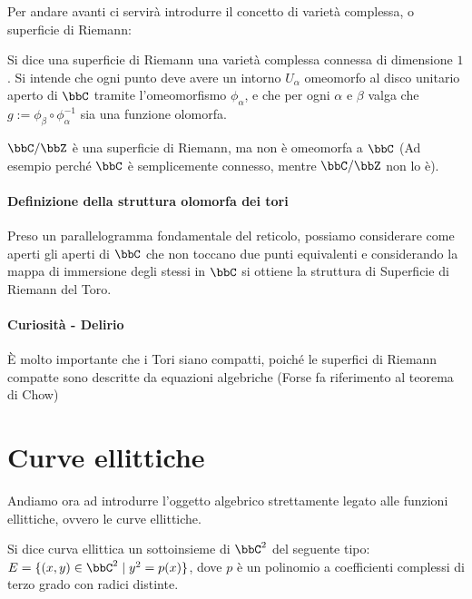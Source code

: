 Per andare avanti ci servirà introdurre il concetto di varietà complessa, o superficie di Riemann:
\begin{definizione}
  Si dice una superficie di Riemann una varietà complessa connessa di dimensione $1$.  Si intende che ogni punto deve avere un intorno $U_\alpha$ omeomorfo al disco unitario aperto di $\bbC$ tramite l'omeomorfismo $\phi_\alpha$, e che per ogni $\alpha$ e $\beta$ valga che $g := \phi_\beta \circ \phi_\alpha^{-1}$ sia una funzione olomorfa.
\end{definizione}

\begin{esempio}
  $\bbC / \bbZ$ è una superficie di Riemann, ma non è omeomorfa a $\bbC$ (Ad esempio perché $\bbC$ è semplicemente connesso, mentre $\bbC / \bbZ$ non lo è).
\end{esempio}

\paragraph{Definizione della struttura olomorfa dei tori}
Preso un parallelogramma fondamentale del reticolo, possiamo considerare come aperti gli aperti di $\bbC$ che non toccano due punti equivalenti e considerando la mappa di immersione degli stessi in $\bbC$ si ottiene la struttura di Superficie di Riemann del Toro.


\paragraph{Curiosità - Delirio}
È molto importante che i Tori siano compatti, poiché le superfici di Riemann compatte sono descritte da equazioni algebriche (Forse fa riferimento al teorema di Chow)


\section{Curve ellittiche}
Andiamo ora ad introdurre l'oggetto algebrico strettamente legato alle funzioni ellittiche, ovvero le curve ellittiche.

\begin{definizione}
  Si dice curva ellittica un sottoinsieme di $\bbC^2$ del seguente tipo: $E = \{ (x,y) \in \bbC^2 \mid y^2 = p(x) \}$, dove $p$ è un polinomio a coefficienti complessi di terzo grado con radici distinte.
\end{definizione}

